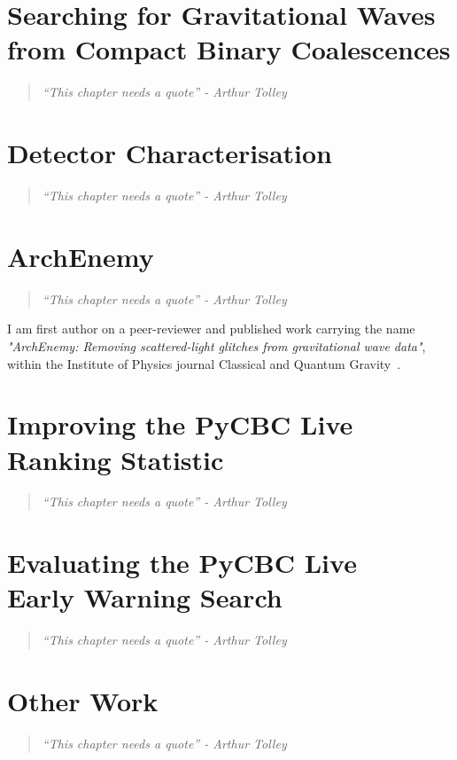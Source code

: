 \documentclass[12pt,twoside]{report} %
\newcommand{\chapterquote}[1]{
  \begin{quote}
    \color{mediumgray}\itshape #1
  \end{quote}
}
\begin{document}
\chapter[Searching for Gravitational Waves from Compact Binary Coalescences]{Searching for Gravitational Waves from Compact Binary Coalescences}
\chapterquote{``This chapter needs a quote'' - Arthur Tolley}


\chapter[Detector Characterisation]{Detector Characterisation}\chapterquote{``This chapter needs a quote'' - Arthur Tolley}


\chapter[ArchEnemy]{ArchEnemy}
\chapterquote{``This chapter needs a quote'' - Arthur Tolley}
I am first author on a peer-reviewer and published work carrying the name \textit{"ArchEnemy: Removing scattered-light glitches from gravitational wave data"}, within the Institute of Physics journal Classical and Quantum Gravity~\cite{ArchEnemy}.


\chapter[Improving the PyCBC Live Ranking Statistic]{Improving the PyCBC Live\\ Ranking Statistic}
\chapterquote{``This chapter needs a quote'' - Arthur Tolley}


\chapter[Evaluating the PyCBC Live Early Warning Search]{Evaluating the PyCBC Live\\ Early Warning Search}
\chapterquote{``This chapter needs a quote'' - Arthur Tolley}


\chapter[]{Other Work}
\chapterquote{``This chapter needs a quote'' - Arthur Tolley}

\end{document}
